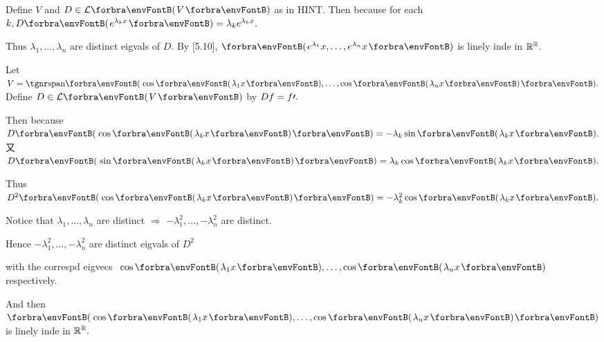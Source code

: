 \documentclass[a4paper, 11pt, UTF8]{article}
\begin{document}
\begin{large}
\par\quad
Define $V$ and $D\in\Lm{V}$ as in H{\small INT}. Then because for each $k, D\Par{e^{\lambda_k x}}=\lambda_k e^{\lambda_k x}.$\par\quad
Thus $\lambda_1,\dots,\lambda_n$ are distinct eigvals of $D.$ By [5.10], $\Par{e^{\lambda_1}x,\dots,e^{\lambda_n}x}$ is linely inde in ${\mathbb{R}}^{{\mathbb{R}}}.$\PfEnd
\SepLine

\par\quad
Let $V=\Span{\cos\Par{\lambda_1 x},\dots,\cos\Par{\lambda_n x}}.$ Define $D\in\Lm{V}$ by $Df=f\prime.$\par\quad
Then because $D\Par{\cos\Par{\lambda_k x}}=-\lambda_k\sin\Par{\lambda_k x}.$ 又 $D\Par{\sin\Par{\lambda_k x}}=\lambda_k\cos\Par{\lambda_k x}.$\par\quad
Thus $D^2\Par{\cos\Par{\lambda_k x}}=-\lambda_k^2\cos\Par{\lambda_k x}.$\par\quad
Notice that $\lambda_1,\dots,\lambda_n$ are distinct $\Rightarrow$ $-\lambda_1^2,\dots,-\lambda_n^2$ are distinct.\par\quad
Hence $-\lambda_1^2,\dots,-\lambda_n^2$ are distinct eigvals of $D^2$\par\qquad\qquad\quad
with the correspd eigvecs \,\,$\cos\Par{\lambda_1 x},\dots,\cos\Par{\lambda_n x}$\,\, respectively.\par\quad
And then $\Par{\cos\Par{\lambda_1 x},\dots,\cos\Par{\lambda_n x}}$ is linely inde in ${\mathbb{R}}^{{\mathbb{R}}}.$\PfEnd
\SepLine


\end{large}
\end{document}
